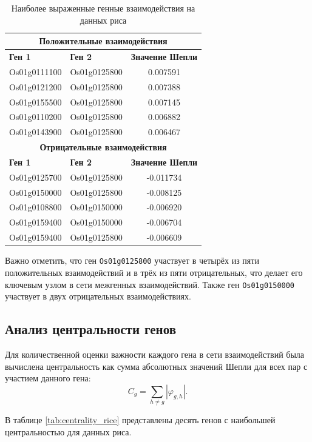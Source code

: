 \begin{table}
	\centering
	\caption{Наиболее выраженные генные взаимодействия на данных риса}
	\label{tab:top_interactions_rice}
	\begin{tabular}{|l|l|c|}
		\hline
		\multicolumn{3}{|c|}{\textbf{Положительные взаимодействия}} \\ \hline
		\textbf{Ген 1} & \textbf{Ген 2} & \textbf{Значение Шепли} \\ \hline
		Os01g0111100 & Os01g0125800 & 0.007591 \\ \hline
		Os01g0121200 & Os01g0125800 & 0.007388 \\ \hline
		Os01g0155500 & Os01g0125800 & 0.007145 \\ \hline
		Os01g0110200 & Os01g0125800 & 0.006882 \\ \hline
		Os01g0143900 & Os01g0125800 & 0.006467 \\ \hline
		\hline
		\multicolumn{3}{|c|}{\textbf{Отрицательные взаимодействия}} \\ \hline
		\textbf{Ген 1} & \textbf{Ген 2} & \textbf{Значение Шепли} \\ \hline
		Os01g0125700 & Os01g0125800 & -0.011734 \\ \hline
		Os01g0150000 & Os01g0125800 & -0.008125 \\ \hline
		Os01g0108800 & Os01g0150000 & -0.006920 \\ \hline
		Os01g0159400 & Os01g0150000 & -0.006704 \\ \hline
		Os01g0159400 & Os01g0125800 & -0.006609 \\ \hline
	\end{tabular}
\end{table}

Важно отметить, что ген \texttt{Os01g0125800} участвует в четырёх из пяти 
положительных взаимодействий и в трёх из пяти отрицательных, что делает 
его ключевым узлом в сети межгенных взаимодействий. Также ген 
\texttt{Os01g0150000} участвует в двух отрицательных взаимодействиях.

\subsection{Анализ центральности генов}

Для количественной оценки важности каждого гена в сети взаимодействий 
была вычислена центральность как сумма абсолютных значений Шепли для 
всех пар с участием данного гена:
\[
C_g = \sum_{h \neq g} |\varphi_{g,h}|.
\]

В таблице \ref{tab:centrality_rice} представлены десять генов с наибольшей 
центральностью для данных риса.

